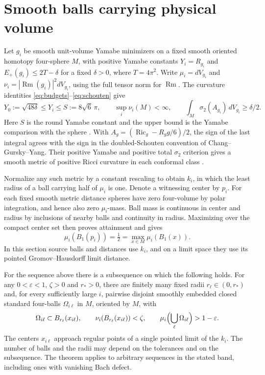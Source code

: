 \section{Smooth balls carrying physical volume}
\label{sec:physical-volume}

Let \(g_i\) be smooth unit-volume Yamabe minimizers on a fixed smooth
oriented homotopy four-sphere \(M\), with positive Yamabe constants
\(Y_i=R_{g_i}\) and \(E_+(g_i)\leq 2T-\delta\) for a fixed
\(\delta>0\), where \(T=4\pi^2\). Write \(\mu_i=dV_{g_i}\) and
\(\nu_i=|\operatorname{Rm}(g_i)|^2dV_{g_i}\), using the full tensor
norm for \(\operatorname{Rm}\). The curvature identities
\eqref{eq:budgets}--\eqref{eq:schouten} give
\[
 Y_0:=\sqrt{48\delta}\leq Y_i\leq S:=8\sqrt{6}\,\pi,
 \qquad \sup_i\nu_i(M)<\infty,
 \qquad \int_M\sigma_2(A_{g_i})\,dV_{g_i}\geq\delta/2.
\]
Here \(S\) is the round Yamabe constant and the upper bound is the
Yamabe comparison with the sphere \cite[Theorem~2]{Schoen1984Yamabe}.
With \(A_g=(\operatorname{Ric}_g-R_g g/6)/2\), the sign of the last
integral agrees with the sign in the doubled-Schouten convention of
Chang--Gursky--Yang. Their positive Yamabe and positive total
\(\sigma_2\) criterion gives a smooth metric of positive Ricci curvature
in each conformal class \cite[Theorem~A and Corollary~B]{ChangGurskyYang2002PositiveRicci}.

Normalize any such metric by a constant rescaling to obtain \(k_i\),
in which the least radius of a ball carrying half of \(\mu_i\) is one.
Denote a witnessing center by \(p_i\). For each fixed smooth metric
distance spheres have zero four-volume by polar integration, and
hence also zero \(\mu_i\)-mass. Ball mass is continuous in center and
radius by inclusions of nearby balls and continuity in radius.
Maximizing over the compact center set then proves attainment and
gives
\[
 \mu_i(B_1(p_i))=\tfrac12=\max_{x\in M}\mu_i(B_1(x)).
\]
In this section source balls and distances use \(k_i\), and on a
limit space they use its pointed Gromov--Hausdorff limit distance.

\begin{theorem}
\label{thm:volume-balls}
For the sequence above there is a subsequence on which the following
holds. For any \(0<\varepsilon<1\), \(\zeta>0\) and \(r_*>0\), there
are finitely many fixed radii \(r_\ell\in(0,r_*)\) and, for every
sufficiently large \(i\), pairwise disjoint smoothly embedded closed
standard four-balls \(\Omega_{i\ell}\) in \(M\), oriented by \(M\),
with
\begin{equation}\label{eq:physical-ball-witness}
 \Omega_{i\ell}\subset B_{r_\ell}(x_{i\ell}),\qquad
 \nu_i(B_{r_\ell}(x_{i\ell}))<\zeta,\qquad
 \mu_i\Bigl(\bigcup_\ell\Omega_{i\ell}\Bigr)>1-\varepsilon.
\end{equation}
The centers \(x_{i\ell}\) approach regular points of a single pointed
limit of the \(k_i\). The number of balls and the radii may depend on
the tolerances and on the subsequence. The theorem applies to arbitrary
sequences in the stated band, including ones with vanishing Bach defect.
\end{theorem}


